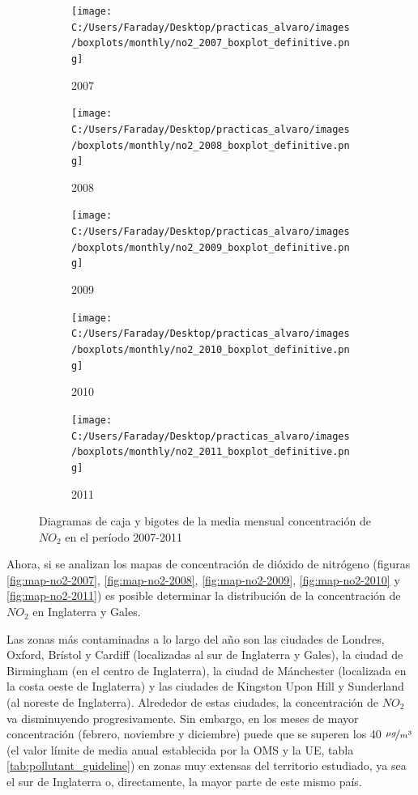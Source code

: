 \documentclass[12pt]{article}
\begin{document}
\begin{figure}[H]
\centering
\begin{subfigure}[H]{0.30\textwidth}
\texttt{[image: C:/Users/Faraday/Desktop/practicas\_alvaro/images/boxplots/monthly/no2\_2007\_boxplot\_definitive.png]}
\captionsetup{labelformat=empty}
\caption{2007}
\label{fig:box-no2-2007}
\end{subfigure}
%
\begin{subfigure}[H]{0.30\textwidth}
\texttt{[image: C:/Users/Faraday/Desktop/practicas\_alvaro/images/boxplots/monthly/no2\_2008\_boxplot\_definitive.png]}
\captionsetup{labelformat=empty}
\caption{2008}
\label{fig:box-no2-2008}
\end{subfigure}
%
\begin{subfigure}[H]{0.30\textwidth}
\texttt{[image: C:/Users/Faraday/Desktop/practicas\_alvaro/images/boxplots/monthly/no2\_2009\_boxplot\_definitive.png]}
\captionsetup{labelformat=empty}
\caption{2009}
\label{fig:box-no2-2009}
\end{subfigure}

\begin{subfigure}[H]{0.30\textwidth}
\texttt{[image: C:/Users/Faraday/Desktop/practicas\_alvaro/images/boxplots/monthly/no2\_2010\_boxplot\_definitive.png]}
\captionsetup{labelformat=empty}
\caption{2010}
\label{fig:box-no2-2010}
\end{subfigure}
%
\begin{subfigure}[H]{0.30\textwidth}
\texttt{[image: C:/Users/Faraday/Desktop/practicas\_alvaro/images/boxplots/monthly/no2\_2011\_boxplot\_definitive.png]}
\captionsetup{labelformat=empty}
\caption{2011}
\label{fig:box-no2-2011}
\end{subfigure}
\caption{Diagramas de caja y bigotes de la media mensual concentración de $NO_{2}$ en el período 2007-2011}
\label{fig:box-no2-monthly}
\end{figure}

Ahora, si se analizan los mapas de concentración de dióxido de nitrógeno (figuras \ref{fig:map-no2-2007}, \ref{fig:map-no2-2008}, \ref{fig:map-no2-2009}, \ref{fig:map-no2-2010} y \ref{fig:map-no2-2011}) es posible determinar la distribución de la concentración de $NO_{2}$ en Inglaterra y Gales.

Las zonas más contaminadas a lo largo del año son las ciudades de Londres, Oxford, Brístol y Cardiff (localizadas al sur de Inglaterra y Gales), la ciudad de Birmingham (en el centro de Inglaterra), la ciudad de Mánchester (localizada en la costa oeste de Inglaterra) y las ciudades de Kingston Upon Hill y Sunderland (al noreste de Inglaterra). Alrededor de estas ciudades, la concentración de $NO_{2}$ va disminuyendo progresivamente. Sin embargo, en los meses de mayor concentración (febrero, noviembre y diciembre) puede que se superen los 40 $\nicefrac{\mu g}{m^3}$ (el valor límite de media anual establecida por la OMS y la UE, tabla \ref{tab:pollutant_guideline}) en zonas muy extensas del territorio estudiado, ya sea el sur de Inglaterra o, directamente, la mayor parte de este mismo país.
\end{document}
